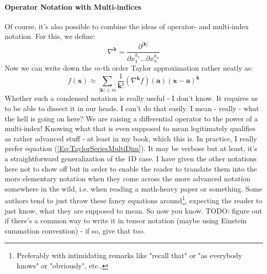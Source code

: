 \paragraph{Operator Notation with Multi-indices}
Of course, it's also possible to combine the ideas of operator- and multi-index notation. For this, we define:
\begin{equation}
\nabla ^ {\mathbf{k}} = \frac{\partial^{|\mathbf{k}|}}{\partial x_1^{k_1} \ldots \partial x_n^{k_n}}
\end{equation}
Now we can write down the $m$-th order Taylor approximation rather neatly as:
\begin{equation}
f(\mathbf{x}) \approx \sum_{|\mathbf{k}| \leq m} \frac{1}{\mathbf{k}!} 
                      (\nabla ^ {\mathbf{k}} f)(\mathbf{a})  (\mathbf{x - a})^{\mathbf{k}}
\end{equation}
Whether such a condensed notation is really useful - I don't know. It requires us to be able to dissect it in our heads. I can't do that easily. I mean - really - what the hell is going on here? We are raising a differential operator to the power of a multi-index! Knowing what that is even supposed to mean legitimately qualifies as rather advanced stuff - at least in my book, which this is. In practice, I really prefer equation (\ref{Eq:TaylorSeriesMultiDim}). It may be verbose but at least, it's a straightforward generalization of the 1D case. I have given the other notations here not to show off but in order to enable the reader to translate them into the more elementary notation when they come across the more advanced notation somewhere in the wild, i.e. when reading a math-heavy paper or something. Some authors tend to just throw these fancy equations around\footnote{Preferably with intimidating remarks like "recall that" or "as everybody knows" or "obviously", etc..}, expecting the reader to just know, what they are supposed to mean. So now you know. TODO: figure out if there's a common way to write it in tensor notation (maybe using Einstein summation convention) - if so, give that too. %





